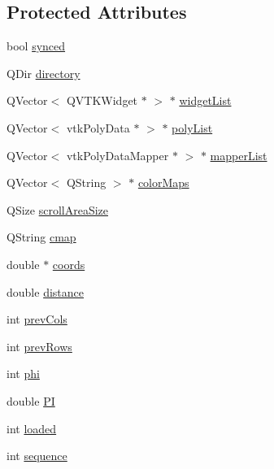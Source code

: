 \subsection*{Protected Attributes}
\begin{DoxyCompactItemize}
\item 
bool \hyperlink{class_shape_population_viewer_a42b6a8e7a7b2c90615e73c80988f547d}{synced}
\item 
Q\-Dir \hyperlink{class_shape_population_viewer_aa466212a0536242cedb4233e4cf6492b}{directory}
\item 
Q\-Vector$<$ Q\-V\-T\-K\-Widget $\ast$ $>$ $\ast$ \hyperlink{class_shape_population_viewer_adaf84d2191b3d5452455bf43864ad2f2}{widget\-List}
\item 
Q\-Vector$<$ vtk\-Poly\-Data $\ast$ $>$ $\ast$ \hyperlink{class_shape_population_viewer_a5533e0d642467a70e349fa79a24bfc51}{poly\-List}
\item 
Q\-Vector$<$ vtk\-Poly\-Data\-Mapper $\ast$ $>$ $\ast$ \hyperlink{class_shape_population_viewer_a512b562448c7236c0c1bdf981a0a7322}{mapper\-List}
\item 
Q\-Vector$<$ Q\-String $>$ $\ast$ \hyperlink{class_shape_population_viewer_aefdd9f2ac19f0e0cd7bdfeb2a94dbcf3}{color\-Maps}
\item 
Q\-Size \hyperlink{class_shape_population_viewer_ae3bbe127e4bac8870cb476084a6d4917}{scroll\-Area\-Size}
\item 
Q\-String \hyperlink{class_shape_population_viewer_a69f478eade0bf23b94037e5a09dfc127}{cmap}
\item 
double $\ast$ \hyperlink{class_shape_population_viewer_aaf35bd7b070b3cef6fa85cd1f07f5ab0}{coords}
\item 
double \hyperlink{class_shape_population_viewer_a55229dfa2500b5417e5afafefcee1e0e}{distance}
\item 
int \hyperlink{class_shape_population_viewer_aa9022fa806169eef3b46a053cc1e11ce}{prev\-Cols}
\item 
int \hyperlink{class_shape_population_viewer_adb72d49a80c7536e0d7ecad1ce3b7fda}{prev\-Rows}
\item 
int \hyperlink{class_shape_population_viewer_a722158753a5d11f2f618d59ae743cb0c}{phi}
\item 
double \hyperlink{class_shape_population_viewer_a9b68299dba604343c319858e005ef644}{P\-I}
\item 
int \hyperlink{class_shape_population_viewer_a6e4ce4ade82b335f5a69ddf054314f16}{loaded}
\item 
int \hyperlink{class_shape_population_viewer_a083b364b39e12244501aca559b68708f}{sequence}
\end{DoxyCompactItemize}
